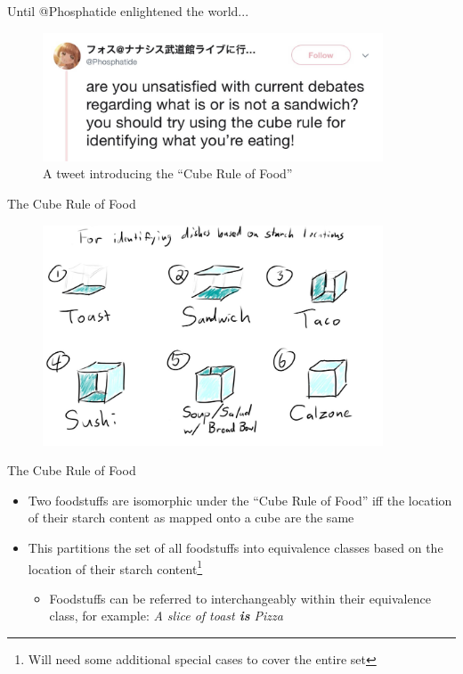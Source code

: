 \documentclass{beamer}
\begin{document}
\begin{frame}{Until @Phosphatide enlightened the world...}
    \begin{figure}
        \includegraphics[width=0.9\textwidth]{images/cube_rule_of_food/phosphatide.jpg}
        \caption{\label{fig:phosphatide}A tweet introducing the ``Cube Rule of Food''\cite{noauthor_phosphatide_nodate}}
    \end{figure}
\end{frame}

\begin{frame}{The Cube Rule of Food}
    \begin{figure}
        \includegraphics[width=0.9\textwidth]{images/cube_rule_of_food/cube_rule_of_food.jpg}
        \label{fig:cube-rule-of-food}
    \end{figure}
\end{frame}

\begin{frame}{The Cube Rule of Food}
    \begin{itemize}
        \item Two foodstuffs are isomorphic under the ``Cube Rule of Food'' iff the location of their starch content as mapped onto a cube are the same
        \vskip 0.5cm
        \item This partitions the set of all foodstuffs into equivalence classes based on the location of their starch content\footnote{Will need some additional special cases to cover the entire set}
        \begin{itemize}
            \item Foodstuffs can be referred to interchangeably within their equivalence class, for example: \textit{A slice of toast \textbf{is} Pizza}
        \end{itemize}
    \end{itemize}
\end{frame}
\end{document}
